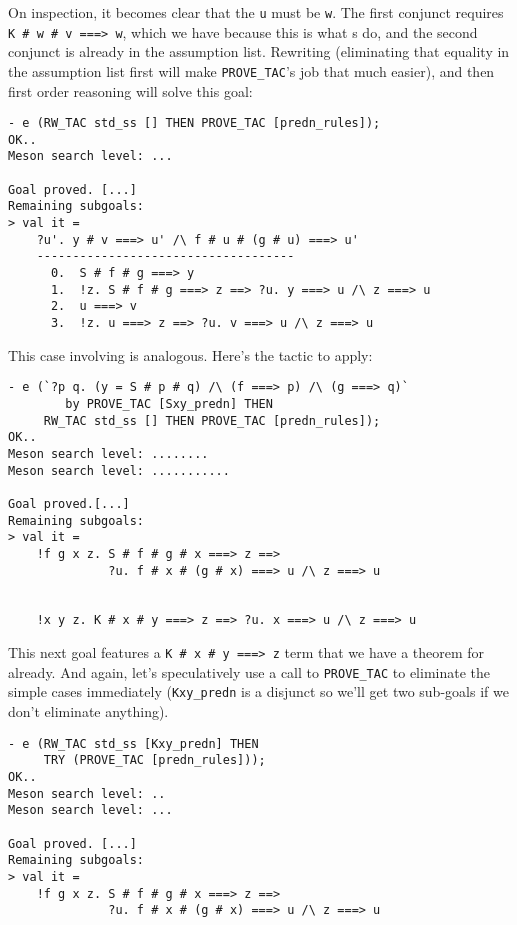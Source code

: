 \documentclass[12pt]{article}
\newcommand{\KC}{\con{K}}
\newcommand{\SC}{\con{S}}
\begin{document}
    On inspection, it becomes clear that the \texttt{u} must be
    \texttt{w}.  The first conjunct requires \verb!K # w # v ===> w!,
    which we have because this is what \KC{}s do, and the second
    conjunct is already in the assumption list.  Rewriting
    (eliminating that equality in the assumption list first will make
    \texttt{PROVE\_TAC}'s job that much easier), and then first order
    reasoning will solve this goal:
\begin{session}\begin{verbatim}
- e (RW_TAC std_ss [] THEN PROVE_TAC [predn_rules]);
OK..
Meson search level: ...

Goal proved. [...]
Remaining subgoals:
> val it =
    ?u'. y # v ===> u' /\ f # u # (g # u) ===> u'
    ------------------------------------
      0.  S # f # g ===> y
      1.  !z. S # f # g ===> z ==> ?u. y ===> u /\ z ===> u
      2.  u ===> v
      3.  !z. u ===> z ==> ?u. v ===> u /\ z ===> u
\end{verbatim}\end{session}
This case involving \SC{} is analogous.  Here's the tactic to apply:
\begin{session}\begin{verbatim}
- e (`?p q. (y = S # p # q) /\ (f ===> p) /\ (g ===> q)`
        by PROVE_TAC [Sxy_predn] THEN
     RW_TAC std_ss [] THEN PROVE_TAC [predn_rules]);
OK..
Meson search level: ........
Meson search level: ...........

Goal proved.[...]
Remaining subgoals:
> val it =
    !f g x z. S # f # g # x ===> z ==>
              ?u. f # x # (g # x) ===> u /\ z ===> u


    !x y z. K # x # y ===> z ==> ?u. x ===> u /\ z ===> u
\end{verbatim}\end{session}
This next goal features a \verb!K # x # y ===> z! term that we have a
theorem for already.  And again, let's speculatively use a call to
\texttt{PROVE\_TAC} to eliminate the simple cases immediately
(\verb!Kxy_predn! is a disjunct so we'll get two sub-goals if we don't
eliminate anything).
\begin{session}\begin{verbatim}
- e (RW_TAC std_ss [Kxy_predn] THEN
     TRY (PROVE_TAC [predn_rules]));
OK..
Meson search level: ..
Meson search level: ...

Goal proved. [...]
Remaining subgoals:
> val it =
    !f g x z. S # f # g # x ===> z ==>
              ?u. f # x # (g # x) ===> u /\ z ===> u
\end{verbatim}\end{session}
\end{document}
